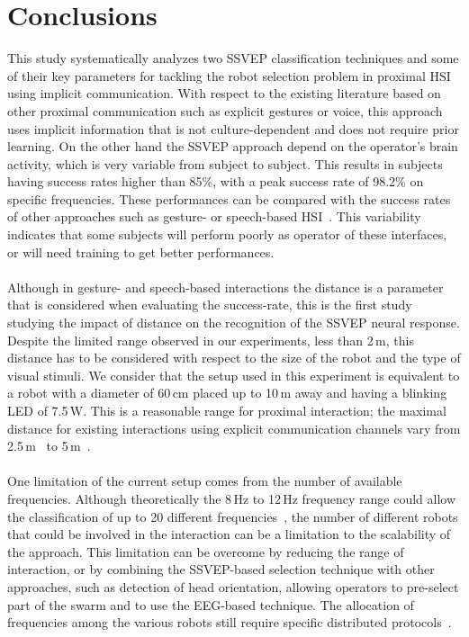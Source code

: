 \documentclass[smallextended]{svjour3}
\begin{document}
\section{Conclusions}
This study systematically analyzes two SSVEP classification techniques and some of their key parameters for tackling the robot selection problem in proximal HSI using implicit communication. 
With respect to the existing literature based on other proximal communication such as explicit gestures or voice, this approach uses implicit information that is not culture-dependent and does not require prior learning. On the other hand the SSVEP approach depend on the operator's brain activity, which is very variable from subject to subject. This results in subjects having success rates higher than 85\%, with a peak success rate of 98.2\% on specific frequencies. These performances can be compared with the success rates of other approaches such as gesture- or speech-based HSI~\cite{Nagietal2014,Pourmehr2013}. This variability indicates that some subjects will perform poorly as operator of these interfaces, or will need training to get better performances.\\
\\
Although in gesture- and speech-based interactions the distance is a parameter that is considered when evaluating the success-rate, this is the first study studying the impact of distance on the recognition of the SSVEP neural response.
Despite the limited range observed in our experiments, less than 2\,m, this distance has to be considered with respect to the size of the robot and the type of visual stimuli. We consider that the setup used in this experiment is equivalent to a robot with a diameter of 60\,cm placed up to 10\,m away and having a blinking LED of 7.5\,W. This is a reasonable range for proximal interaction; the maximal distance for existing interactions using explicit communication channels vary from 2.5\,m~\cite{Pourmehr2013} to 5\,m~\cite{Pourmehr2013}.\\
\\
One limitation of the current setup comes from the number of available frequencies.
Although theoretically the 8\,Hz to 12\,Hz frequency range could allow the classification of up to 20 different frequencies~\cite{SSVEPfiability}, the number of different robots that could be involved in the interaction can be a limitation to the scalability of the approach. This limitation can be overcome by reducing the range of interaction, or by combining the SSVEP-based selection technique with other approaches, such as detection of head orientation, allowing operators to pre-select part of the swarm and to use the EEG-based technique. The allocation of frequencies among the various robots still require specific distributed protocols~\cite{mathews2015spatially}.\\
\end{document}
